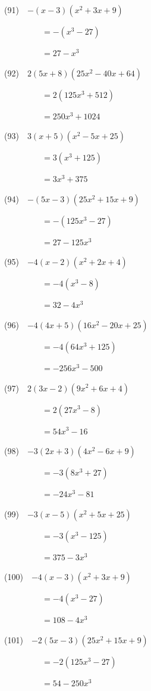 \documentclass[a4j,twocolumn,10pt,fleqn]{jarticle}
\begin{document}
(91)~~$-\left(x - 3\right) \left(x^{2} + 3 x + 9\right)$

~~~~~~~~~$=-(x^{3} - 27)$

~~~~~~~~~$=27 - x^{3}$

(92)~~$2\left(5 x + 8\right) \left(25 x^{2} - 40 x + 64\right)$

~~~~~~~~~$=2(125 x^{3} + 512)$

~~~~~~~~~$=250 x^{3} + 1024$

(93)~~$3\left(x + 5\right) \left(x^{2} - 5 x + 25\right)$

~~~~~~~~~$=3(x^{3} + 125)$

~~~~~~~~~$=3 x^{3} + 375$

(94)~~$-\left(5 x - 3\right) \left(25 x^{2} + 15 x + 9\right)$

~~~~~~~~~$=-(125 x^{3} - 27)$

~~~~~~~~~$=27 - 125 x^{3}$

(95)~~$-4\left(x - 2\right) \left(x^{2} + 2 x + 4\right)$

~~~~~~~~~$=-4(x^{3} - 8)$

~~~~~~~~~$=32 - 4 x^{3}$

(96)~~$-4\left(4 x + 5\right) \left(16 x^{2} - 20 x + 25\right)$

~~~~~~~~~$=-4(64 x^{3} + 125)$

~~~~~~~~~$=- 256 x^{3} - 500$

(97)~~$2\left(3 x - 2\right) \left(9 x^{2} + 6 x + 4\right)$

~~~~~~~~~$=2(27 x^{3} - 8)$

~~~~~~~~~$=54 x^{3} - 16$

(98)~~$-3\left(2 x + 3\right) \left(4 x^{2} - 6 x + 9\right)$

~~~~~~~~~$=-3(8 x^{3} + 27)$

~~~~~~~~~$=- 24 x^{3} - 81$

(99)~~$-3\left(x - 5\right) \left(x^{2} + 5 x + 25\right)$

~~~~~~~~~$=-3(x^{3} - 125)$

~~~~~~~~~$=375 - 3 x^{3}$

(100)~~$-4\left(x - 3\right) \left(x^{2} + 3 x + 9\right)$

~~~~~~~~~$=-4(x^{3} - 27)$

~~~~~~~~~$=108 - 4 x^{3}$

(101)~~$-2\left(5 x - 3\right) \left(25 x^{2} + 15 x + 9\right)$

~~~~~~~~~$=-2(125 x^{3} - 27)$

~~~~~~~~~$=54 - 250 x^{3}$
\end{document}
